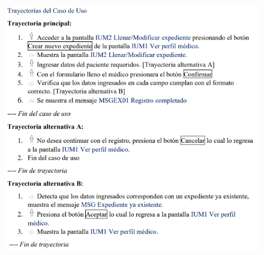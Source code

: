 \documentclass[12pt,letterpaper]{article}
\begin{document}
            \begin{figure}[H]
                \centering
                \includegraphics [scale=0.9]{specs/trayCrearExpediente}
            \end{figure}
\end{document}
